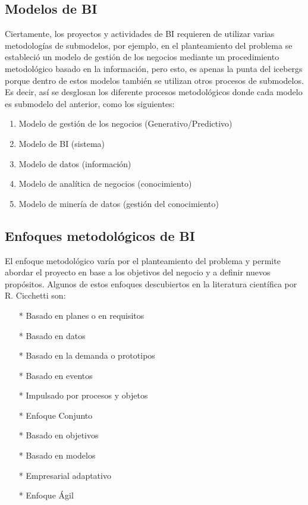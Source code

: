 \documentclass[11pt,titlepage]{report}
\begin{document}
\subsection{Modelos de BI}

Ciertamente, los proyectos y actividades de BI requieren de utilizar varias metodologías de submodelos, por ejemplo, en el planteamiento del problema se estableció un modelo de gestión de los negocios mediante un procedimiento metodológico basado en la información, pero esto, es apenas la punta del icebergs porque dentro de estos modelos también se utilizan otros procesos de submodelos. Es decir, así se desglosan los diferente procesos metodológicos donde cada modelo es submodelo del anterior, como los siguientes: 
\begin{enumerate}
\item Modelo de gestión de los negocios (Generativo/Predictivo)

\item Modelo de BI (sistema)

\item Modelo de datos (información)

\item Modelo de analítica de negocios (conocimiento)

\item Modelo de minería de datos (gestión del conocimiento)
\end{enumerate}


\subsection{Enfoques metodológicos de BI}

El enfoque metodológico varía por el planteamiento del problema y permite abordar el proyecto en base a los objetivos del negocio y a definir nuevos propósitos. Algunos de estos enfoques descubiertos en la literatura científica por R. Cicchetti \cite{web05} son:
\begin{multicols}{2}
	\begin{itemize}
		\item[*] Basado en planes o en requisitos
		\item[*] Basado en datos
		\item[*] Basado en la demanda o prototipos
		\item[*] Basado en eventos
		\item[*] Impulsado por procesos y objetos
		\item[*] Enfoque Conjunto
		\item[*] Basado en objetivos
		\item[*] Basado en modelos
		\item[*] Empresarial adaptativo
		\item[*] Enfoque Ágil
	\end{itemize} 
\end{multicols}
\end{document}
